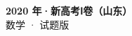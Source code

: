 \documentclass[zihao=-4, a4paper]{ctexart}
\begin{document}
\begin{center}
  {\Large\bfseries 2020 年·新高考Ⅰ卷（山东）}\\[4pt]
  {\large 数学 · 试题版}
\end{center}
\medskip
{}

\end{document}
